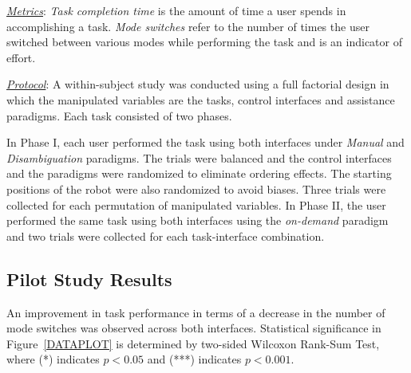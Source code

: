 \documentclass[conference]{IEEEtran}
\begin{document}
\noindent\underline{\textit{Metrics}}: \textit{Task completion time} is the amount of time a user spends in accomplishing a task. \textit{Mode switches} refer to the number of times the user switched between various modes while performing the task and is an indicator of effort. 

\noindent\underline{\textit{Protocol}}: A within-subject study was conducted using a full factorial design in which the manipulated variables are the tasks, control interfaces and assistance paradigms. Each task consisted of two phases. 

In Phase I, each user performed the task using both interfaces under \textit{Manual} and \textit{Disambiguation} paradigms. The trials were balanced and the control interfaces and the paradigms were randomized to eliminate ordering effects. The starting positions of the robot were also randomized to avoid biases. Three trials were collected for each permutation of manipulated variables. 
In Phase II, the user performed the same task using both interfaces using the \textit{on-demand} paradigm and two trials were collected for each task-interface combination.  



\subsection{Pilot Study Results}\label{RES}
An improvement in task performance in terms of a decrease in the number of mode switches was observed across both interfaces. Statistical significance in Figure~\ref{DATAPLOT} is determined by two-sided Wilcoxon Rank-Sum Test, where (*) indicates $p < 0.05$ and (***) indicates $p < 0.001$.
\end{document}
